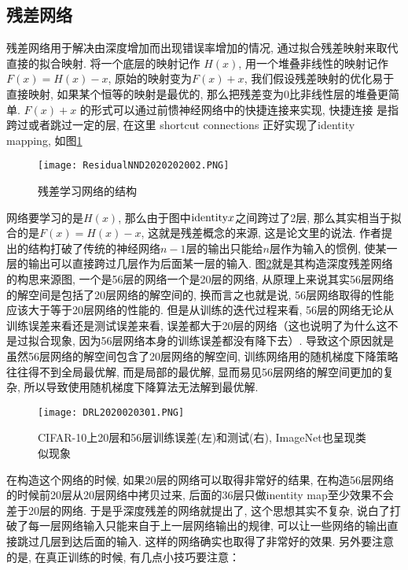 \subsection{残差网络}
残差网络用于解决由深度增加而出现错误率增加的情况, 通过拟合残差映射来取代直接的拟合映射.
将一个底层的映射记作 $H(x)$, 用一个堆叠非线性的映射记作 $F(x) = H(x) - x$, 原始的映射变为$F(x) + x$, 我们假设残差映射的优化易于直接映射, 如果某个恒等的映射是最优的, 那么把残差变为0比非线性层的堆叠更简单.
$F(x) + x$ 的形式可以通过前愦神经网络中的快捷连接来实现, 快捷连接 是指跨过或者跳过一定的层, 在这里 shortcut connections 正好实现了identity mapping, 如图\ref{ResidualNND2020202002}
\begin{figure}[H]
\centering
\texttt{[image: ResidualNND2020202002.PNG]}
\caption{残差学习网络的结构}
\label{ResidualNND2020202002}
\end{figure}
网络要学习的是$H(x)$, 那么由于图中$\textup{identity} x$之间跨过了2层, 那么其实相当于拟合的是$F(x)=H(x)-x$, 这就是残差概念的来源, 这是论文里的说法.
作者提出的结构打破了传统的神经网络$n-1$层的输出只能给$n$层作为输入的惯例, 使某一层的输出可以直接跨过几层作为后面某一层的输入.
图\ref{DRL2020020301}就是其构造深度残差网络的构思来源图, 一个是56层的网络一个是20层的网络, 从原理上来说其实56层网络的解空间是包括了20层网络的解空间的, 换而言之也就是说, 56层网络取得的性能应该大于等于20层网络的性能的.
但是从训练的迭代过程来看, 56层的网络无论从训练误差来看还是测试误差来看, 误差都大于20层的网络（这也说明了为什么这不是过拟合现象, 因为56层网络本身的训练误差都没有降下去）.
导致这个原因就是虽然56层网络的解空间包含了20层网络的解空间, 训练网络用的随机梯度下降策略往往得不到全局最优解, 而是局部的最优解, 显而易见56层网络的解空间更加的复杂, 所以导致使用随机梯度下降算法无法解到最优解.
\begin{figure}[H]
\centering
\texttt{[image: DRL2020020301.PNG]}
\caption{CIFAR-10上20层和56层训练误差(左)和测试(右), ImageNet也呈现类似现象}
\label{DRL2020020301}
\end{figure}

在构造这个网络的时候, 如果20层的网络可以取得非常好的结果, 在构造56层网络的时候前20层从20层网络中拷贝过来, 后面的36层只做inentity map至少效果不会差于20层的网络.
于是乎深度残差的网络就提出了, 这个思想其实不复杂, 说白了打破了每一层网络输入只能来自于上一层网络输出的规律, 可以让一些网络的输出直接跳过几层到达后面的输入.
这样的网络确实也取得了非常好的效果. 另外要注意的是, 在真正训练的时候, 有几点小技巧要注意：

